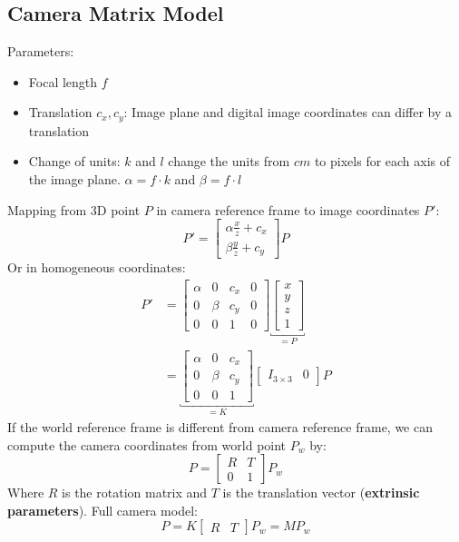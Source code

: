 \documentclass[8pt, a4paper, landscape, includeheadfoot]{extarticle}
\begin{document}
\begin{multicols*}{4}
	\section{Camera Matrix Model}
	Parameters:
	\begin{itemize}[itemsep=0pt, leftmargin=8pt]
		\item Focal length $f$
		\item Translation $c_x, c_y$: Image plane and digital image coordinates can differ by a translation
		\item Change of units: $k$ and $l$ change the units from $cm$ to pixels for each axis of the image plane. $\alpha = f\cdot k$ and $\beta = f \cdot l$
	\end{itemize}
	Mapping from 3D point $P$ in camera reference frame to image coordinates $P'$:
	$$
		P' = \begin{bmatrix}
			\alpha \frac{x}{z} + c_x \\
			\beta \frac{y}{z} + c_y
		\end{bmatrix} P
	$$
	Or in homogeneous coordinates:
	\begin{align*}
		P' & = \begin{bmatrix}
			\alpha & 0     & c_x & 0 \\
			0      & \beta & c_y & 0 \\
			0      & 0     & 1   & 0
		\end{bmatrix} \underbracket{\begin{bmatrix}
				x \\ y\\ z \\1
			\end{bmatrix}}_{=P}    \\
		   & = \underbracket{\begin{bmatrix}
				\alpha & 0     & c_x \\
				0      & \beta & c_y \\
				0      & 0     & 1
			\end{bmatrix} }_{=K} \begin{bmatrix}
			I_{3\times 3} & 0
		\end{bmatrix} P
	\end{align*}
	If the world reference frame is different from camera reference frame, we can compute the camera coordinates from world point $P_w$ by:
	$$
		P = \begin{bmatrix}
			R & T \\
			0 & 1
		\end{bmatrix} P_w
	$$
	Where $R$ is the rotation matrix and $T$ is the translation vector (\textbf{extrinsic parameters}).
	Full camera model:
	$$
		P = K\begin{bmatrix}
			R & T
		\end{bmatrix} P_w = MP_w
	$$


\end{multicols*}
\end{document}
